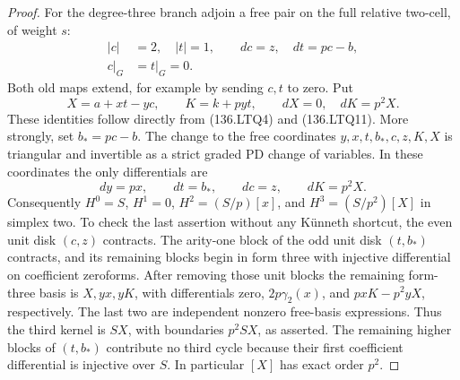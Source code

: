 \begin{proof}
For the degree-three branch adjoin a free pair on the full
relative two-cell, of weight \(s\):
\[
 \begin{aligned}
 |c|&=2,\quad |t|=1,\qquad dc=z,\quad dt=pc-b,\\
 c|_G&=t|_G=0.
 \end{aligned}
                                                        \tag{136.LTQ11}
\]
Both old maps extend, for example by sending \(c,t\) to
zero.  Put
\[
 X=a+xt-yc,\qquad K=k+pyt,\qquad dX=0,\quad dK=p^2X.
                                                        \tag{136.LTQ12}
\]
These identities follow directly from (136.LTQ4) and
(136.LTQ11).  More strongly, set \(b_*=pc-b\).
The change to the free coordinates
\(y,x,t,b_*,c,z,K,X\) is triangular and invertible
as a strict graded PD change of variables.  In these coordinates
the only differentials are
\[
               dy=px,\qquad dt=b_*,\qquad dc=z,\qquad dK=p^2X.
                                                        \tag{136.LTQ13}
\]
Consequently \(H^0=S\), \(H^1=0\),
\(H^2=(S/p)[x]\), and \(H^3=(S/p^2)[X]\)
in simplex two.  To check the last assertion without any
K\"unneth shortcut, the even unit disk \((c,z)\)
contracts.  The arity-one block of the odd unit disk
\((t,b_*)\) contracts, and its remaining blocks begin
in form three with injective differential on coefficient
zeroforms.  After removing those unit blocks the remaining form-three
basis is \(X,yx,yK\), with differentials zero,
\(2p\gamma_2(x)\), and \(p xK-p^2yX\), respectively.
The last two are independent nonzero free-basis expressions.
Thus the third kernel is \(SX\), with boundaries
\(p^2SX\), as asserted.  The remaining higher blocks of
\((t,b_*)\) contribute no third cycle because their first
coefficient differential is injective over \(S\).
In particular \([X]\) has exact order \(p^2\).


\end{proof}
